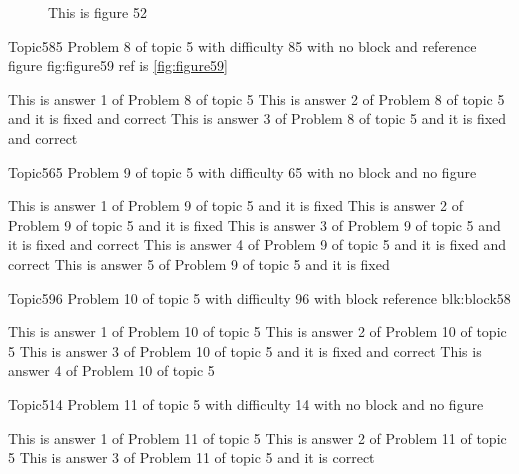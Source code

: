 \documentclass[master]{exam}
\begin{document}
\begin{figure}
	\begin{center}
		This is figure 52 
		\label{fig:figure52}
	\end{center}
\end{figure}

\begin{problem}{Topic5}{85}
	Problem 8 of topic 5 with difficulty 85 with no block and reference figure fig:figure59 ref is \ref{fig:figure59}
	\begin{answers}
		\answer This is answer 1 of Problem 8 of topic 5 
		 This is answer 2 of Problem 8 of topic 5 and it is fixed and correct
		 This is answer 3 of Problem 8 of topic 5 and it is fixed and correct
	\end{answers}
\end{problem}

\begin{problem}{Topic5}{65}
	Problem 9 of topic 5 with difficulty 65 with no block and no figure
	\begin{answers}
		\answer[fixed] This is answer 1 of Problem 9 of topic 5 and it is fixed
		\answer[fixed] This is answer 2 of Problem 9 of topic 5 and it is fixed
		 This is answer 3 of Problem 9 of topic 5 and it is fixed and correct
		 This is answer 4 of Problem 9 of topic 5 and it is fixed and correct
		\answer[fixed] This is answer 5 of Problem 9 of topic 5 and it is fixed
	\end{answers}
\end{problem}

\begin{problem}[requires=blk:block58]{Topic5}{96}
	Problem 10 of topic 5 with difficulty 96 with block reference blk:block58
	\begin{answers}
		\answer This is answer 1 of Problem 10 of topic 5 
		\answer This is answer 2 of Problem 10 of topic 5 
		 This is answer 3 of Problem 10 of topic 5 and it is fixed and correct
		\answer This is answer 4 of Problem 10 of topic 5 
	\end{answers}
\end{problem}

\begin{problem}{Topic5}{14}
	Problem 11 of topic 5 with difficulty 14 with no block and no figure
	\begin{answers}
		\answer This is answer 1 of Problem 11 of topic 5 
		\answer This is answer 2 of Problem 11 of topic 5 
		\answer[correct] This is answer 3 of Problem 11 of topic 5 and it is correct
	\end{answers}
\end{problem}
\end{document}
